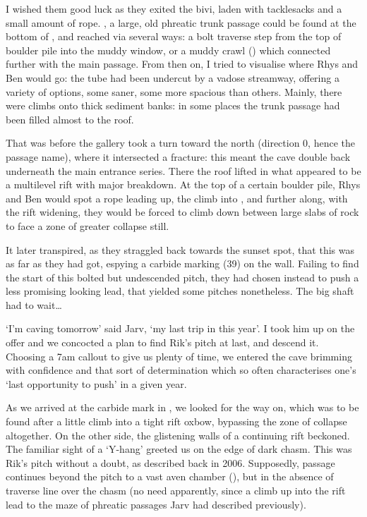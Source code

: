 I wished them good luck as they exited the bivi, laden with tacklesacks and a small amount of rope. , a large, old phreatic trunk passage could be found at the bottom of , and reached via several ways: a bolt traverse step from the top of boulder pile into the muddy window, or a muddy crawl () which connected further with the main passage. From then on, I tried to visualise where Rhys and Ben would go: the tube had been undercut by a vadose streamway, offering a variety of options, some saner, some more spacious than others. Mainly, there were climbs onto thick sediment banks: in some places the trunk passage had been filled almost to the roof. 

That was before the gallery took a turn toward the north (direction 0, hence the passage name), where it intersected a fracture: this meant the cave double back underneath the main  entrance series. There the roof lifted in what appeared to be a multilevel rift with major breakdown. At the top of a certain boulder pile, Rhys and Ben would spot a rope leading up, the climb into , and further along, with the rift widening, they would be forced to climb down between large slabs of rock to face a zone of greater collapse still. 

It later transpired, as they straggled back towards the sunset spot, that this was as far as they had got, espying a carbide marking (39) on the wall. Failing to find the start of this bolted but undescended pitch, they had chosen instead to push a less promising looking lead, that yielded some pitches nonetheless. The big shaft had to wait…

‘I’m caving tomorrow’ said Jarv, ‘my last trip in  this year’. I took him up on the offer and we concocted a plan to find Rik’s pitch at last, and descend it. Choosing a 7am callout to give us plenty of time, we entered the cave brimming with confidence and that sort of determination which so often characterises one’s ‘last opportunity to push’ in a given year. 

As we arrived at the carbide mark in , we looked for the way on, which was to be found after a little climb into a tight rift oxbow, bypassing the zone of collapse altogether. On the other side, the glistening walls of a continuing rift beckoned. The familiar sight of a ‘Y-hang’ greeted us on the edge of dark chasm. This was Rik’s pitch without a doubt, as described back in 2006. Supposedly,  passage continues beyond the pitch to a vast aven chamber (), but in the absence of traverse line over the chasm (no need apparently, since a climb up into the rift lead to the maze of phreatic passages Jarv had described previously).


